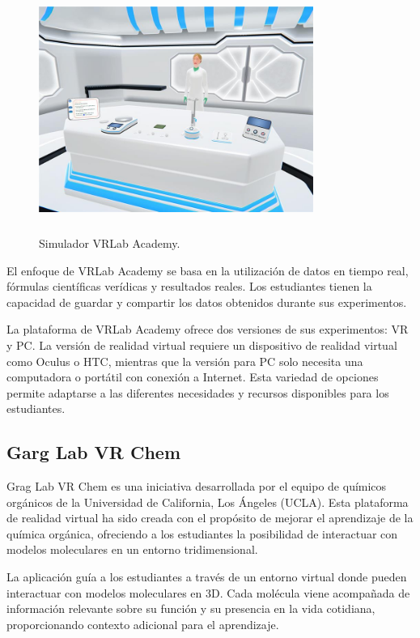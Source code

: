\begin{figure}[thbp]
    \centering
    \includegraphics[width=0.8\textwidth, height=8cm]{img/chapter01/Chemistry_Lab_-_VRLab_Academy.jpg}
    \caption{Simulador VRLab Academy.}\label{fig:Esquema}
\end{figure}

El enfoque de VRLab Academy se basa en la utilización de datos en tiempo real, fórmulas científicas verídicas y resultados reales. Los estudiantes tienen la capacidad de guardar y compartir los datos obtenidos durante sus experimentos.

La plataforma de VRLab Academy ofrece dos versiones de sus experimentos: VR y PC. La versión de realidad virtual requiere un dispositivo de realidad virtual como Oculus o HTC, mientras que la versión para PC solo necesita una computadora o portátil con conexión a Internet. Esta variedad de opciones permite adaptarse a las diferentes necesidades y recursos disponibles para los estudiantes.

\newpage
\subsection{Garg Lab VR Chem}

Grag Lab VR Chem es una iniciativa desarrollada por el equipo de químicos orgánicos de la Universidad de California, Los Ángeles (UCLA). Esta plataforma de realidad virtual ha sido creada con el propósito de mejorar el aprendizaje de la química orgánica, ofreciendo a los estudiantes la posibilidad de interactuar con modelos moleculares en un entorno tridimensional.

La aplicación guía a los estudiantes a través de un entorno virtual donde pueden interactuar con modelos moleculares en 3D. Cada molécula viene acompañada de información relevante sobre su función y su presencia en la vida cotidiana, proporcionando contexto adicional para el aprendizaje.

